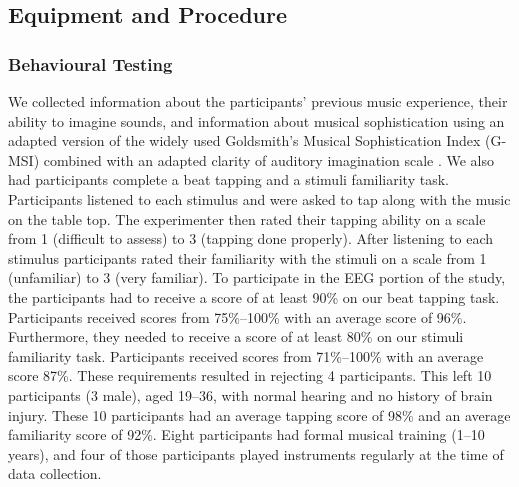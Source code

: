 \subsection*{Equipment and Procedure}
\subsubsection*{Behavioural Testing}
We collected information about the participants' previous music experience, their ability to imagine sounds, and information about musical sophistication using an adapted version of the widely used Goldsmith's Musical Sophistication Index (G-MSI) \cite{mullensiefen_musicality_2014} combined with an adapted clarity of auditory imagination scale \cite{willander_imagery_scale_2010}. 
We also had participants complete a beat tapping and a stimuli familiarity task. 
Participants listened to each stimulus and were asked to tap along with the music on the table top. The experimenter then rated their tapping ability on a scale from 1 (difficult to assess) to 3 (tapping done properly). 
After listening to each stimulus participants rated their familiarity with the stimuli on a scale from 1 (unfamiliar) to 3 (very familiar).
To participate in the \ac{EEG} portion of the study, the participants had to receive a score of at least 90\% on our beat tapping task. Participants received scores from 75\%--100\% with an average score of 96\%.
Furthermore, they needed to receive a score of at least 80\% on our stimuli familiarity task. 
Participants received scores from 71\%--100\% with an average score 87\%.
These requirements resulted in rejecting 4 participants.
This left 10 participants (3 male), aged 19--36, with normal hearing and no history of brain injury. 
These 10 participants had an average tapping score of 98\% and an average familiarity score of 92\%.
Eight participants had formal musical training (1--10 years), and four of those participants played instruments regularly at the time of data collection.


